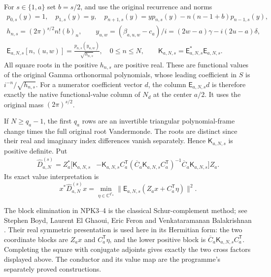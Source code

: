 \documentclass[11pt,a4paper]{article}
\begin{document}
For $s\in\{1,a\}$ set $b=s/2$, and use the original recurrence and norms
\[
 \begin{gathered}
 p_{0,s}(y)=1,\quad p_{1,s}(y)=y,\quad
 p_{n+1,s}(y)=yp_{n,s}(y)-n(n-1+b)p_{n-1,s}(y),\\
 h_{n,s}=(2\pi)^{s/2}n!(b)_n,\qquad
 y_{u,w}=(\beta_{a,u,w}-c_a)/i
       =(2w-a)\gamma-i(2u-a)\delta,\\
 \mathsf E_{a,N,s}[n,(u,w)]
   =\frac{p_{n,s}(y_{u,w})}{\sqrt{h_{n,s}}},\quad 0\le n\le N,
 \qquad \mathsf K_{a,N,s}=\mathsf E_{a,N,s}^*\mathsf E_{a,N,s}.
 \end{gathered}\tag{NPK2}
\]
All square roots in the positive $h_{n,s}$ are positive real. These
are functional values of the original Gamma orthonormal polynomials,
whose leading coefficient in $S$ is $i^{-n}/\sqrt{h_{n,s}}$.
For a numerator coefficient vector $d$, the column
$\mathsf E_{a,N,s}d$ is therefore exactly the native functional-value
column of $N_d$ at the center $a/2$. It uses the original mass
$(2\pi)^{s/2}$.

If $N\ge q_a-1$, the first $q_a$ rows are an invertible triangular
polynomial-frame change times the full original root Vandermonde.
The roots are distinct since their real and imaginary index differences
vanish separately. Hence $\mathsf K_{a,N,s}$ is positive definite.
Put
\[
 \begin{split}
 \widehat D_{a,N}^{(s)}=Z_a^*\bigl[\mathsf K_{a,N,s}
 &-\mathsf K_{a,N,s}C_a^{\mathsf T}
   (\overline C_a\mathsf K_{a,N,s}C_a^{\mathsf T})^{-1}
                  \overline C_a\mathsf K_{a,N,s}\bigr]Z_a .
 \end{split}\tag{NPK3}
\]
Its exact value interpretation is
\[
 x^*\widehat D_{a,N}^{(s)}x
   =\min_{\eta\in\mathbb C^{q'_a}}
       \|\mathsf E_{a,N,s}(Z_ax+C_a^{\mathsf T}\eta)\|^2.
 \tag{NPK4}
\]


The block elimination in NPK3--4 is the classical Schur-complement
method; see Stephen Boyd, Laurent El Ghaoui, Eric Feron and
Venkataramanan Balakrishnan \cite[\S2.1, pp.~7--8, (2.3)--(2.4)]{human:boyd1994}.
Their real symmetric presentation is used here in its Hermitian form:
the two coordinate blocks are $Z_ax$ and $C_a^{\mathsf T}\eta$, and
the lower positive block is
$\overline C_a\mathsf K_{a,N,s}C_a^{\mathsf T}$.
Completing the square with conjugate adjoints gives exactly the two
cross factors displayed above. The conductor and its value map are
the programme's separately proved constructions.
\end{document}
